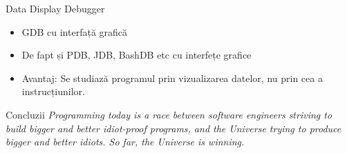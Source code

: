 \documentclass{beamer}
\begin{document}
\begin{frame}{Data Display Debugger}
\begin{itemize}
\item GDB cu interfață grafică
\item \pause De fapt și PDB, JDB, BashDB etc cu interfețe grafice
\item \pause Avantaj: \pause Se studiază programul prin vizualizarea datelor, nu prin cea a instrucțiunilor.
\end{itemize}
\end{frame}

\begin{frame}{Concluzii}
\textit{Programming today is a race between software engineers striving to build bigger and better idiot-proof programs, and the Universe trying to produce bigger and better idiots. So far, the Universe is winning.}
\end{frame}
\end{document}
